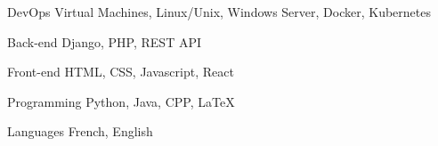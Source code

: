 

\begin{cvskills}

  \cvskill
    {DevOps} %
    {Virtual Machines, Linux/Unix, Windows Server, Docker, Kubernetes} %

  \cvskill
    {Back-end} %
    {Django, PHP, REST API} %

  \cvskill
    {Front-end} %
    {HTML, CSS, Javascript, React} %

  \cvskill
    {Programming} %
    {Python, Java, CPP, LaTeX} %

  \cvskill
    {Languages} %
    {French, English} %

\end{cvskills}
